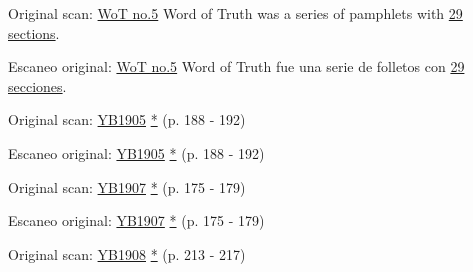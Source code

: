 



Original scan: \href{https://adl.b2.adventistdigitallibrary.org/concern/published_works/4ffda25e-a06b-48d4-8ace-67cdcd33726f}{WoT no.5}
Word of Truth was a series of pamphlets with \href{https://adl.b2.adventistdigitallibrary.org/concern/parent/22267078_fundamental_principles_of_seventh_day_adventists/published_works/94a22141-33e8-4b9a-b397-2fe48c17bec4}{29 sections}.


Escaneo original: \href{https://adl.b2.adventistdigitallibrary.org/concern/published_works/4ffda25e-a06b-48d4-8ace-67cdcd33726f}{WoT no.5}
Word of Truth fue una serie de folletos con \href{https://adl.b2.adventistdigitallibrary.org/concern/parent/22267078_fundamental_principles_of_seventh_day_adventists/published_works/94a22141-33e8-4b9a-b397-2fe48c17bec4}{29 secciones}.






Original scan: \href{https://documents.adventistarchives.org/Yearbooks/YB1905.pdf#search=Yearbook%201905}{YB1905} \href{https://forgotten-pillar.s3.us-east-2.amazonaws.com/YB1905.pdf}{*} (p. 188 - 192)


Escaneo original: \href{https://documents.adventistarchives.org/Yearbooks/YB1905.pdf#search=Yearbook%201905}{YB1905} \href{https://forgotten-pillar.s3.us-east-2.amazonaws.com/YB1905.pdf}{*} (p. 188 - 192)






Original scan: \href{https://documents.adventistarchives.org/Yearbooks/YB1907.pdf#search=Yearbook%201906}{YB1907} \href{https://forgotten-pillar.s3.us-east-2.amazonaws.com/YB1907.pdf}{*} (p. 175 - 179)


Escaneo original: \href{https://documents.adventistarchives.org/Yearbooks/YB1907.pdf#search=Yearbook%201906}{YB1907} \href{https://forgotten-pillar.s3.us-east-2.amazonaws.com/YB1907.pdf}{*} (p. 175 - 179)






Original scan: \href{https://documents.adventistarchives.org/Yearbooks/YB1908.pdf#search=Yearbook%201906}{YB1908} \href{https://forgotten-pillar.s3.us-east-2.amazonaws.com/YB1908.pdf}{*} (p. 213 - 217)


